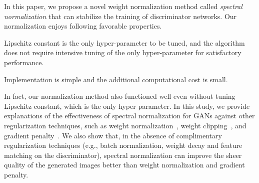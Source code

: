 \documentclass{article}
\newenvironment{tight_itemize}{
\begin{itemize}
  \setlength{\itemsep}{0pt}
  \setlength{\parskip}{0pt}
  \setlength{\topsep}{0pt}
  \setlength{\partopsep}{0pt}
}{\end{itemize}}
\begin{document}
In this paper, we propose a novel weight normalization method called \textit{spectral normalization} that can stabilize the training of discriminator networks.
Our normalization enjoys following favorable properties.
\begin{tight_itemize}
\item Lipschitz constant is the only hyper-parameter to be tuned, and the algorithm does not require intensive tuning of the only hyper-parameter for satisfactory performance.
\item Implementation is simple and the additional computational cost is small.
\end{tight_itemize}
In fact, our normalization method also functioned well even without tuning Lipschitz constant, which is the only hyper parameter.
In this study, we provide explanations of the effectiveness of spectral normalization for GANs against other regularization techniques, such as weight normalization~\cite[]{salimans2016weight}, weight clipping~\cite[]{arjovsky2017wasserstein}, and gradient penalty~\cite[]{gulrajani2017improved}.
We also show that, in the absence of complimentary regularization techniques (e.g., batch normalization, weight decay and feature matching on the discriminator), spectral normalization can improve the sheer quality of the generated images better than weight normalization and gradient penalty.
\end{document}
